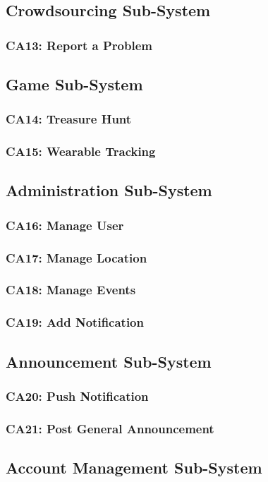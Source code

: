 \documentclass[12pt,a4paper]{article}
\begin{document}
	\subsection{Crowdsourcing Sub-System}
		\subsubsection{CA13: Report a Problem}
	\subsection{Game Sub-System}
		\subsubsection{CA14: Treasure Hunt}
		\subsubsection{CA15: Wearable Tracking}
	\subsection{Administration Sub-System}
		\subsubsection{CA16: Manage User}
		\subsubsection{CA17: Manage Location}
		\subsubsection{CA18: Manage Events}
		\subsubsection{CA19: Add Notification}
	\subsection{Announcement Sub-System}
		\subsubsection{CA20: Push Notification}
		\subsubsection{CA21: Post General Announcement}
	\subsection{Account Management Sub-System}
\end{document}
